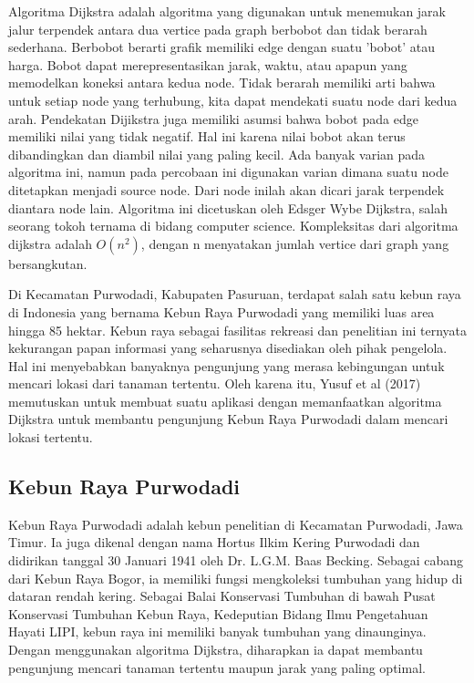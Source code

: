 \documentclass[10pt, conference]{IEEEtran}
\begin{document}
Algoritma Dijkstra adalah algoritma yang digunakan untuk menemukan jarak jalur terpendek antara dua vertice pada graph berbobot dan tidak berarah sederhana. Berbobot berarti grafik memiliki edge dengan suatu ’bobot’ atau harga. Bobot dapat merepresentasikan jarak, waktu, atau apapun yang memodelkan koneksi antara kedua node. Tidak berarah memiliki arti bahwa untuk setiap node yang terhubung, kita dapat mendekati suatu node dari kedua arah. Pendekatan Dijikstra juga memiliki asumsi bahwa bobot pada edge memiliki nilai yang tidak negatif. Hal ini karena nilai bobot akan terus dibandingkan dan diambil nilai yang paling kecil. Ada banyak varian pada algoritma ini, namun pada percobaan ini digunakan varian dimana suatu node ditetapkan menjadi source node. Dari node inilah akan dicari jarak terpendek diantara node lain. Algoritma ini dicetuskan oleh Edsger Wybe Dijkstra, salah seorang tokoh ternama di bidang computer science. Kompleksitas dari algoritma dijkstra adalah $O(n^2)$, dengan n menyatakan jumlah vertice dari graph yang
bersangkutan. 

Di Kecamatan Purwodadi, Kabupaten Pasuruan, terdapat salah satu kebun raya di Indonesia yang bernama Kebun Raya Purwodadi yang memiliki luas area hingga 85 hektar. Kebun raya sebagai fasilitas rekreasi dan penelitian ini ternyata kekurangan papan informasi yang seharusnya disediakan oleh pihak pengelola. Hal ini menyebabkan banyaknya pengunjung yang merasa kebingungan untuk mencari lokasi dari tanaman tertentu. Oleh karena itu, Yusuf et al (2017) memutuskan untuk membuat suatu aplikasi dengan memanfaatkan algoritma Dijkstra untuk membantu pengunjung Kebun Raya Purwodadi
dalam mencari lokasi tertentu. 

\subsection{Kebun Raya Purwodadi}
Kebun Raya Purwodadi adalah kebun penelitian di Kecamatan Purwodadi, Jawa Timur. Ia juga dikenal dengan nama Hortus Ilkim Kering Purwodadi dan didirikan tanggal 30 Januari 1941 oleh Dr. L.G.M. Baas Becking. Sebagai cabang dari Kebun Raya Bogor, ia memiliki fungsi mengkoleksi tumbuhan yang hidup di dataran rendah kering. Sebagai Balai Konservasi Tumbuhan di bawah Pusat Konservasi Tumbuhan Kebun Raya, Kedeputian Bidang Ilmu Pengetahuan Hayati LIPI, kebun raya ini memiliki banyak tumbuhan yang dinaunginya. Dengan menggunakan algoritma Dijkstra, diharapkan ia dapat membantu pengunjung mencari tanaman tertentu maupun jarak
yang paling optimal. 
\end{document}
